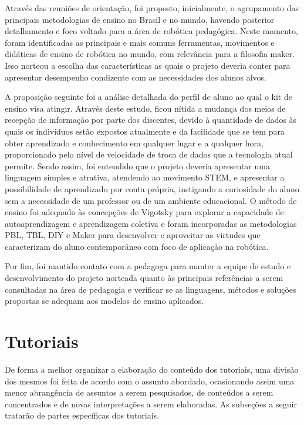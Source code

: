 Através das reuniões de orientação, foi proposto, inicialmente, o agrupamento das principais metodologias de ensino no Brasil e no mundo, havendo posterior detalhamento e foco voltado para a área de robótica pedagógica. Neste momento, foram identificadas as principais e mais comuns ferramentas, movimentos e didáticas de ensino de robótica no mundo, com relevância para a filosofia maker. Isso norteou a escolha das características as quais o projeto deveria conter para apresentar desempenho condizente com as necessidades dos alunos alvos.

A proposição seguinte foi a análise detalhada do perfil de aluno ao qual o kit de ensino visa atingir. Através deste estudo, ficou nítida a mudança dos meios de recepção de informação por parte dos discentes, devido à quantidade de dados às quais os indivíduos estão expostos atualmente e da facilidade que se tem para obter aprendizado e conhecimento em qualquer lugar e a qualquer hora, proporcionado pelo nível de velocidade de troca de dados que a tecnologia atual permite. Sendo assim, foi entendido que o projeto deveria apresentar uma linguagem simples e atrativa, atendendo ao movimento STEM, e apresentar a possibilidade de aprendizado por conta própria, instigando a curiosidade do aluno sem a necessidade de um professor ou de um ambiente educacional. O método de ensino foi adequado às concepções de Vigotsky para explorar a capacidade de autoaprendizagem e aprendizagem coletiva e foram incorporadas as metodologias PBL, TBL, DIY e Maker para desenvolver e aproveitar as virtudes que caracterizam do aluno contemporâneo com foco de aplicação na robótica.

Por fim, foi mantido contato com a pedagoga para manter a equipe de estudo e desenvolvimento do projeto norteada quanto às principais referências a serem consultadas na área de pedagogia e verificar se as linguagens, métodos e soluções propostas se adequam aos modelos de ensino aplicados.


\section{Tutoriais}
De forma a melhor organizar a elaboração do conteúdo dos tutoriais, uma divisão dos mesmos foi feita de acordo com o assunto abordado, ocasionando assim uma menor abrangência de assuntos a serem pesquisados, de conteúdos a serem concentrados e de novas interpretações a serem elaboradas. As subseções a seguir tratarão de partes específicas dos tutoriais.

